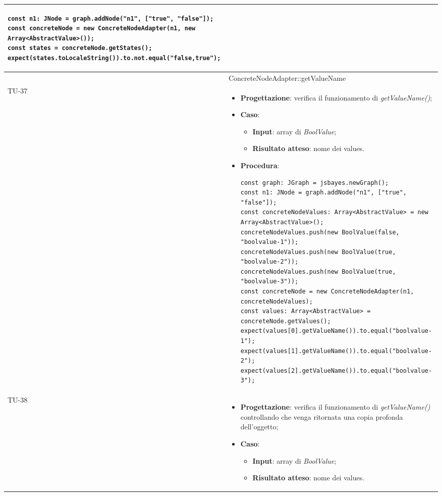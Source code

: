 \begin{longtable}{|C{1.5cm}|C{14.5cm}|}
\begin{itemize}
\begin{lstlisting}
const n1: JNode = graph.addNode("n1", ["true", "false"]);
const concreteNode = new ConcreteNodeAdapter(n1, new Array<AbstractValue>());
const states = concreteNode.getStates();
expect(states.toLocaleString()).to.not.equal("false,true");
		\end{lstlisting}
	\end{itemize}\\
	\hline
{} & ConcreteNodeAdapter::getValueName\\
	\hline
	{TU-37} &
	\begin{itemize}
		\item \textbf{Progettazione}: verifica il funzionamento di \emph{getValueName()};
		\item \textbf{Caso}: 
		\begin{itemize}
			\item \textbf{Input}: array di \emph{BoolValue};
			\item \textbf{Risultato atteso}: nome dei values.
		\end{itemize}
		\item \textbf{Procedura}:
		\begin{lstlisting}
const graph: JGraph = jsbayes.newGraph();
const n1: JNode = graph.addNode("n1", ["true", "false"]);
const concreteNodeValues: Array<AbstractValue> = new Array<AbstractValue>();
concreteNodeValues.push(new BoolValue(false, "boolvalue-1"));
concreteNodeValues.push(new BoolValue(true, "boolvalue-2"));
concreteNodeValues.push(new BoolValue(true, "boolvalue-3"));
const concreteNode = new ConcreteNodeAdapter(n1, concreteNodeValues);
const values: Array<AbstractValue> = concreteNode.getValues();
expect(values[0].getValueName()).to.equal("boolvalue-1");
expect(values[1].getValueName()).to.equal("boolvalue-2");
expect(values[2].getValueName()).to.equal("boolvalue-3");
		\end{lstlisting}
	\end{itemize}\\
	\hline
	{TU-38} &
	\begin{itemize}
		\item \textbf{Progettazione}: verifica il funzionamento di \emph{getValueName()} controllando che venga ritornata una copia profonda dell'oggetto;
		\item \textbf{Caso}: 
		\begin{itemize}
			\item \textbf{Input}: array di \emph{BoolValue};
			\item \textbf{Risultato atteso}: nome dei values.
		\end{itemize}

\end{itemize}
\end{longtable}
